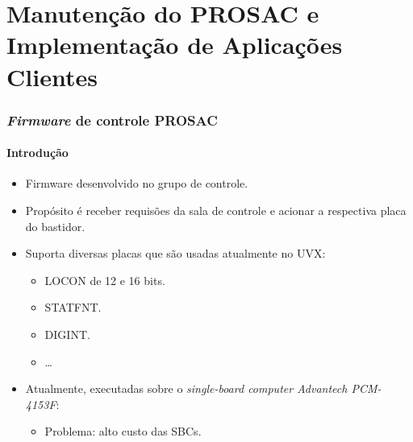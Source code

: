 
\section {Manutenção do PROSAC e Implementação de Aplicações Clientes}

\begin{frame}
\frametitle {\textit{Firmware} de controle PROSAC}
\framesubtitle{Introdução}

\begin{itemize}
  \item Firmware desenvolvido no grupo de controle.
  \item Propósito é receber requisões da sala de controle e acionar a respectiva placa do bastidor. 
  \item Suporta diversas placas que são usadas atualmente no UVX:
  \begin{itemize}
    \item LOCON de 12 e 16 bits.
    \item STATFNT.
    \item DIGINT.
    \item \ldots
   \end{itemize}
   \item Atualmente, executadas sobre o \textit{single-board computer Advantech
   PCM-4153F}:
   \begin{itemize} 
   		\item Problema: alto custo das SBCs.
   \end{itemize} 
\end{itemize}

\end{frame}


